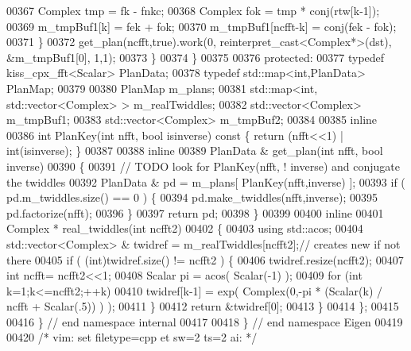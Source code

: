 \begin{DoxyCode}
00367           Complex tmp = fk - fnkc;
00368           Complex fok = tmp * conj(rtw[k-1]);
00369           m\_tmpBuf1[k] = fek + fok;
00370           m\_tmpBuf1[ncfft-k] = conj(fek - fok);
00371         \}
00372         get\_plan(ncfft,\textcolor{keyword}{true}).work(0, reinterpret\_cast<Complex*>(dst), &m\_tmpBuf1[0], 1,1);
00373       \}
00374     \}
00375 
00376   \textcolor{keyword}{protected}:
00377   \textcolor{keyword}{typedef} kiss\_cpx\_fft<Scalar> PlanData;
00378   \textcolor{keyword}{typedef} std::map<int,PlanData> PlanMap;
00379 
00380   PlanMap m\_plans;
00381   std::map<int, std::vector<Complex> > m\_realTwiddles;
00382   std::vector<Complex> m\_tmpBuf1;
00383   std::vector<Complex> m\_tmpBuf2;
00384 
00385   \textcolor{keyword}{inline}
00386     \textcolor{keywordtype}{int} PlanKey(\textcolor{keywordtype}{int} nfft, \textcolor{keywordtype}{bool} isinverse)\textcolor{keyword}{ const }\{ \textcolor{keywordflow}{return} (nfft<<1) | int(isinverse); \}
00387 
00388   \textcolor{keyword}{inline}
00389     PlanData & get\_plan(\textcolor{keywordtype}{int} nfft, \textcolor{keywordtype}{bool} inverse)
00390     \{
00391       \textcolor{comment}{// TODO look for PlanKey(nfft, ! inverse) and conjugate the twiddles}
00392       PlanData & pd = m\_plans[ PlanKey(nfft,inverse) ];
00393       \textcolor{keywordflow}{if} ( pd.m\_twiddles.size() == 0 ) \{
00394         pd.make\_twiddles(nfft,inverse);
00395         pd.factorize(nfft);
00396       \}
00397       \textcolor{keywordflow}{return} pd;
00398     \}
00399 
00400   \textcolor{keyword}{inline}
00401     Complex * real\_twiddles(\textcolor{keywordtype}{int} ncfft2)
00402     \{
00403       \textcolor{keyword}{using} std::acos;
00404       std::vector<Complex> & twidref = m\_realTwiddles[ncfft2];\textcolor{comment}{// creates new if not there}
00405       \textcolor{keywordflow}{if} ( (\textcolor{keywordtype}{int})twidref.size() != ncfft2 ) \{
00406         twidref.resize(ncfft2);
00407         \textcolor{keywordtype}{int} ncfft= ncfft2<<1;
00408         Scalar pi =  acos( Scalar(-1) );
00409         \textcolor{keywordflow}{for} (\textcolor{keywordtype}{int} k=1;k<=ncfft2;++k) 
00410           twidref[k-1] = exp( Complex(0,-pi * (Scalar(k) / ncfft + Scalar(.5)) ) );
00411       \}
00412       \textcolor{keywordflow}{return} &twidref[0];
00413     \}
00414 \};
00415 
00416 \} \textcolor{comment}{// end namespace internal}
00417 
00418 \} \textcolor{comment}{// end namespace Eigen}
00419 
00420 \textcolor{comment}{/* vim: set filetype=cpp et sw=2 ts=2 ai: */}
\end{DoxyCode}
